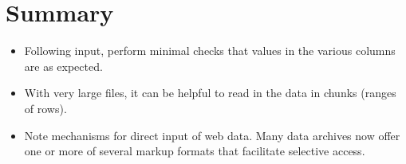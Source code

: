 \section{Summary}
\begin{itemize}

\item[] Following input, perform minimal checks that
  values in the various columns are as expected.

\item[] With very large files, it can be helpful to read in the
  data in chunks (ranges of rows).

\item[] Note mechanisms for direct input of web data.  Many data
  archives now offer one or more of several markup formats that
  facilitate selective access.
\end{itemize}
